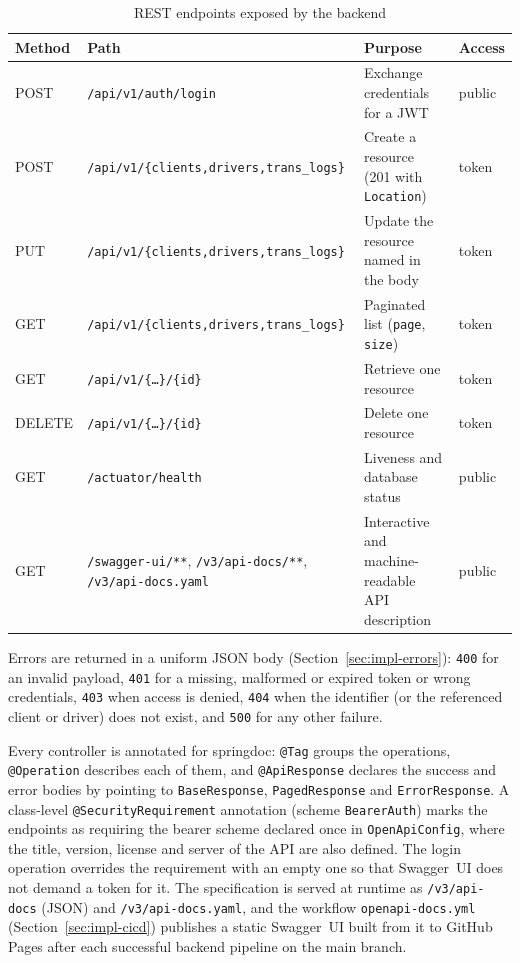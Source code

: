 \begin{table}[H]
\centering
\caption{REST endpoints exposed by the backend}
\label{tab:endpoints}
\small
\begin{tabularx}{\linewidth}{@{}l l X l@{}}
\toprule
\textbf{Method} & \textbf{Path} & \textbf{Purpose} & \textbf{Access} \\
\midrule
POST & \texttt{/api/v1/auth/login} & Exchange credentials for a JWT & public \\
POST & \texttt{/api/v1/\{clients,drivers,trans\_logs\}} & Create a resource (201 with \texttt{Location}) & token \\
PUT & \texttt{/api/v1/\{clients,drivers,trans\_logs\}} & Update the resource named in the body & token \\
GET & \texttt{/api/v1/\{clients,drivers,trans\_logs\}} & Paginated list (\texttt{page}, \texttt{size}) & token \\
GET & \texttt{/api/v1/\{\dots\}/\{id\}} & Retrieve one resource & token \\
DELETE & \texttt{/api/v1/\{\dots\}/\{id\}} & Delete one resource & token \\
GET & \texttt{/actuator/health} & Liveness and database status & public \\
GET & \texttt{/swagger-ui/**}, \texttt{/v3/api-docs/**}, \texttt{/v3/api-docs.yaml} & Interactive and machine-readable API description & public \\
\bottomrule
\end{tabularx}
\end{table}

Errors are returned in a uniform JSON body (Section~\ref{sec:impl-errors}): \texttt{400} for an invalid payload, \texttt{401} for a missing, malformed or expired token or wrong credentials, \texttt{403} when access is denied, \texttt{404} when the identifier (or the referenced client or driver) does not exist, and \texttt{500} for any other failure.

Every controller is annotated for springdoc: \texttt{@Tag} groups the operations, \texttt{@Operation} describes each of them, and \texttt{@ApiResponse} declares the success and error bodies by pointing to \texttt{BaseResponse}, \texttt{PagedResponse} and \texttt{ErrorResponse}. A class-level \texttt{@SecurityRequirement} annotation (scheme \texttt{BearerAuth}) marks the endpoints as requiring the bearer scheme declared once in \texttt{OpenApiConfig}, where the title, version, license and server of the API are also defined. The login operation overrides the requirement with an empty one so that Swagger~UI does not demand a token for it. The specification is served at runtime as \texttt{/v3/api-docs} (JSON) and \texttt{/v3/api-docs.yaml}, and the workflow \texttt{openapi-docs.yml} (Section~\ref{sec:impl-cicd}) publishes a static Swagger~UI built from it to GitHub Pages after each successful backend pipeline on the main branch.


